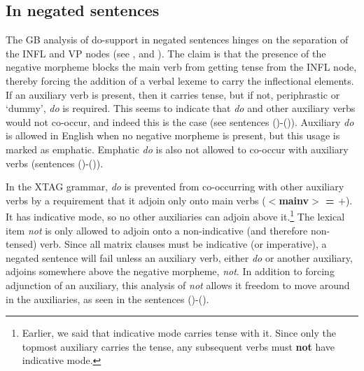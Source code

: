 \subsection{In negated sentences}
\label{do-support-negatives}

The GB analysis of do-support in negated sentences hinges on the separation of
the INFL and VP nodes (see \cite{chomsky65}, \cite{jackendoff72} and
\cite{chomsky86}).  The claim is that the presence of the negative morpheme
blocks the main verb from getting tense from the INFL node, thereby forcing the
addition of a verbal lexeme to carry the inflectional elements.  If an
auxiliary verb is present, then it carries tense, but if not, periphrastic or
`dummy', {\it do} is required.  This seems to indicate that {\it do} and other
auxiliary verbs would not co-occur, and indeed this is the case (see sentences
()-()).  Auxiliary {\it do} is allowed in English when no
negative morpheme is present, but this usage is marked as emphatic.  Emphatic
{\it do} is also not allowed to co-occur with auxiliary verbs (sentences
()-()).



In the XTAG grammar, {\it do} is prevented from co-occurring with other
auxiliary verbs by a requirement that it adjoin only onto main verbs
({\bf $<$mainv$>$ = $+$}).  It has
indicative mode, so no other auxiliaries can adjoin above it.\footnote{Earlier,
we said that indicative mode carries tense with it.  Since only the topmost
auxiliary carries the tense, any subsequent verbs must {\bf not} have
indicative mode.}  The lexical item {\it not} is only allowed to adjoin onto a
non-indicative (and therefore non-tensed) verb.  Since all matrix clauses must
be indicative (or imperative), a negated sentence will fail unless an auxiliary
verb, either {\it do} or another auxiliary, adjoins somewhere above the
negative morpheme, {\it not}. In addition to forcing adjunction of an
auxiliary, this analysis of {\it not} allows it freedom to move around in the
auxiliaries, as seen in the sentences ()-().

